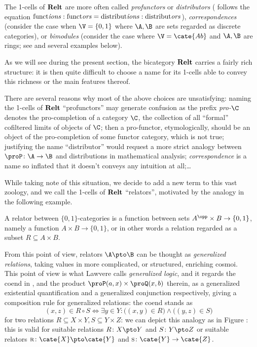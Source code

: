 \begin{remark}
The 1-cells of $\textbf{Relt}$ are more often called \emph{profunctors} or \emph{distributors} (\cite{benabou2000distributors} follows the equation $\text{funct\emph{ions}} : \text{funct\emph{ors}} = \text{distribut\emph{ions}} : \text{distribut\emph{ors}}$), \emph{correspondences} (consider the case when $\V=\{0,1\}$ \ie where $\A, \B$ are sets regarded as discrete categories), or \emph{bimodules} (consider the case where $\V=\cate{Ab}$ and $\A,\B$ are rings; see \cite{nashphd} and several examples below).

As we will see during the present section, the bicategory $\textbf{Relt}$ carries a fairly rich structure: it is then quite difficult to choose a name for its 1-cells able to convey this richness or the main features thereof. 

There are several reasons why most of the above choices are unsatisfying: naming the 1-cells of $\textbf{Relt}$ ``profunctors'' may generate confusion as the prefix \emph{pro-$\C$} denotes the pro-completion of a category $\C$, \ie the collection of all ``formal'' cofiltered limits of objects of $\C$; then a pro-functor, etymologically, should be an object of the pro-completion of some functor category, which is not true; justifying the name ``distributor'' would request a more strict analogy between $\proP \colon \A \to \B$ and distributions in mathematical analysis; \emph{correspondence} is a name so inflated that it doesn't conveys any intuition at all;\dots

While taking note of this situation, we decide to add a new term to this vast zoology, and we call the 1-cells of $\textbf{Relt}$ ``relators'', motivated by the analogy in the following example.
\end{remark}
\begin{example}
A relator between $\{0,1\}$-categories is a function between sets $A^\opp\times B\to \{0,1\}$, namely a function $A\times B \to \{0,1\}$, or in other words a relation regarded as a subset $R\subseteq A\times B$.

From this point of view, relators $\A\pto \B$ can be thought as \emph{generalized relations}, taking values in more complicated, or structured, enriching cosmoi. This point of view is what Lawvere \cite[\S\textbf{4},\textbf{5}]{LawvereFW:metsgl} calls \emph{generalized logic}, and it regards the coend in \adef {}, and the product $\proP(a,x)\times \proQ(x,b)$ therein, as a generalized existential quantification and a generalized conjunction respectively, giving a composition rule for generalized relations: the coend stands as
\[
(x,z)\in R\circ S \iff \exists y\in Y : \big((x,y)\in R\big)\land \big((y,z)\in S\big)
\]
for two relations $R\subseteq X\times Y, S\subseteq Y\times Z$: we can depict this analogy as in Figure : this is valid for suitable relations $R\colon X\pto Y$ and $S\colon Y\pto Z$ or suitable relators $\textsc{r}\colon \cate{X}\pto \cate{Y}$ and $\textsc{s}\colon \cate{Y}\to\cate{Z}$.
\end{example}
